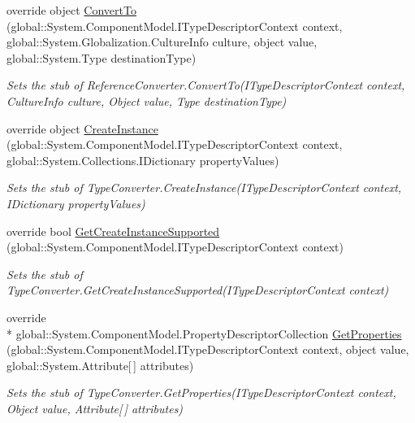 \begin{DoxyCompactItemize}
override object \hyperlink{class_system_1_1_component_model_1_1_fakes_1_1_stub_reference_converter_a38d8a031816e9d02ba96f6a1deaace3d}{Convert\-To} (global\-::\-System.\-Component\-Model.\-I\-Type\-Descriptor\-Context context, global\-::\-System.\-Globalization.\-Culture\-Info culture, object value, global\-::\-System.\-Type destination\-Type)
\begin{DoxyCompactList}\small\item\em Sets the stub of Reference\-Converter.\-Convert\-To(\-I\-Type\-Descriptor\-Context context, Culture\-Info culture, Object value, Type destination\-Type)\end{DoxyCompactList}\item 
override object \hyperlink{class_system_1_1_component_model_1_1_fakes_1_1_stub_reference_converter_a52284100d7995b7cba750a8aeee4110b}{Create\-Instance} (global\-::\-System.\-Component\-Model.\-I\-Type\-Descriptor\-Context context, global\-::\-System.\-Collections.\-I\-Dictionary property\-Values)
\begin{DoxyCompactList}\small\item\em Sets the stub of Type\-Converter.\-Create\-Instance(\-I\-Type\-Descriptor\-Context context, I\-Dictionary property\-Values)\end{DoxyCompactList}\item 
override bool \hyperlink{class_system_1_1_component_model_1_1_fakes_1_1_stub_reference_converter_a83f5d9c5effbf63394d5582c5c1f33b0}{Get\-Create\-Instance\-Supported} (global\-::\-System.\-Component\-Model.\-I\-Type\-Descriptor\-Context context)
\begin{DoxyCompactList}\small\item\em Sets the stub of Type\-Converter.\-Get\-Create\-Instance\-Supported(\-I\-Type\-Descriptor\-Context context)\end{DoxyCompactList}\item 
override \\*
global\-::\-System.\-Component\-Model.\-Property\-Descriptor\-Collection \hyperlink{class_system_1_1_component_model_1_1_fakes_1_1_stub_reference_converter_a1646cbd5237e2d80c38401c44fd9d9af}{Get\-Properties} (global\-::\-System.\-Component\-Model.\-I\-Type\-Descriptor\-Context context, object value, global\-::\-System.\-Attribute\mbox{[}$\,$\mbox{]} attributes)
\begin{DoxyCompactList}\small\item\em Sets the stub of Type\-Converter.\-Get\-Properties(\-I\-Type\-Descriptor\-Context context, Object value, Attribute\mbox{[}$\,$\mbox{]} attributes)\end{DoxyCompactList}\item 

\end{DoxyCompactItemize}
